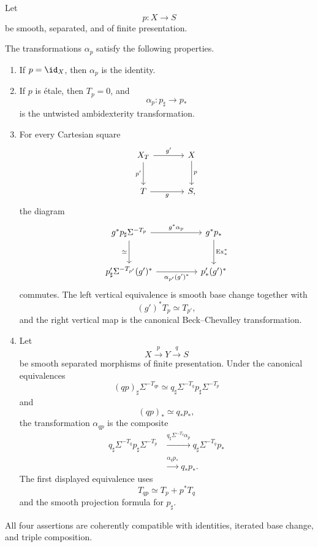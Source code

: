 \begin{proposition}
\label{prop:ambidexterity-formal-properties}
Let
\[
    p:X\longrightarrow S
\]
be smooth, separated, and of finite presentation.

The transformations \(\alpha_p\) satisfy the following properties.

\begin{enumerate}
    \item If \(p=\id_X\), then \(\alpha_p\) is the identity.

    \item If \(p\) is \'{e}tale, then \(T_p=0\), and
    \[
        \alpha_p:
        p_\sharp
        \longrightarrow
        p_*
    \]
    is the untwisted ambidexterity transformation.

    \item For every Cartesian square
    \[
    \begin{tikzcd}[column sep=large,row sep=large]
        X_T \arrow[r,"g'"] \arrow[d,"p'"']
            & X \arrow[d,"p"] \\
        T \arrow[r,"g"'] & S,
    \end{tikzcd}
    \]
    the diagram
    \[
    \begin{tikzcd}[column sep=huge,row sep=large]
        g^*p_\sharp\Sigma^{-T_p}
            \arrow[r,"g^*\alpha_p"]
            \arrow[d,"\simeq"']
            &
        g^*p_*
            \arrow[d,"\operatorname{Ex}^{*}_{*}"]
        \\
        p'_\sharp\Sigma^{-T_{p'}}(g')^*
            \arrow[r,"\alpha_{p'}(g')^*"']
            &
        p'_*(g')^*
    \end{tikzcd}
    \]
    commutes.  The left vertical equivalence is smooth base change together
    with
    \[
        (g')^*T_p\simeq T_{p'},
    \]
    and the right vertical map is the canonical Beck--Chevalley
    transformation.

    \item Let
    \[
        X\xrightarrow{p}Y\xrightarrow{q}S
    \]
    be smooth separated morphisms of finite presentation.  Under the
    canonical equivalences
    \[
        (qp)_\sharp\Sigma^{-T_{qp}}
        \simeq
        q_\sharp\Sigma^{-T_q}
        p_\sharp\Sigma^{-T_p}
    \]
    and
    \[
        (qp)_*
        \simeq
        q_*p_*,
    \]
    the transformation \(\alpha_{qp}\) is the composite
    \[
    \begin{aligned}
        q_\sharp\Sigma^{-T_q}
        p_\sharp\Sigma^{-T_p}
        &\xrightarrow{
          q_\sharp\Sigma^{-T_q}\alpha_p
        }
        q_\sharp\Sigma^{-T_q}p_* \\
        &\xrightarrow{
          \alpha_q p_*
        }
        q_*p_*.
    \end{aligned}
    \]
    The first displayed equivalence uses
    \[
        T_{qp}
        \simeq
        T_p+p^*T_q
    \]
    and the smooth projection formula for \(p_\sharp\).
\end{enumerate}

All four assertions are coherently compatible with identities, iterated base
change, and triple composition.
\end{proposition}

